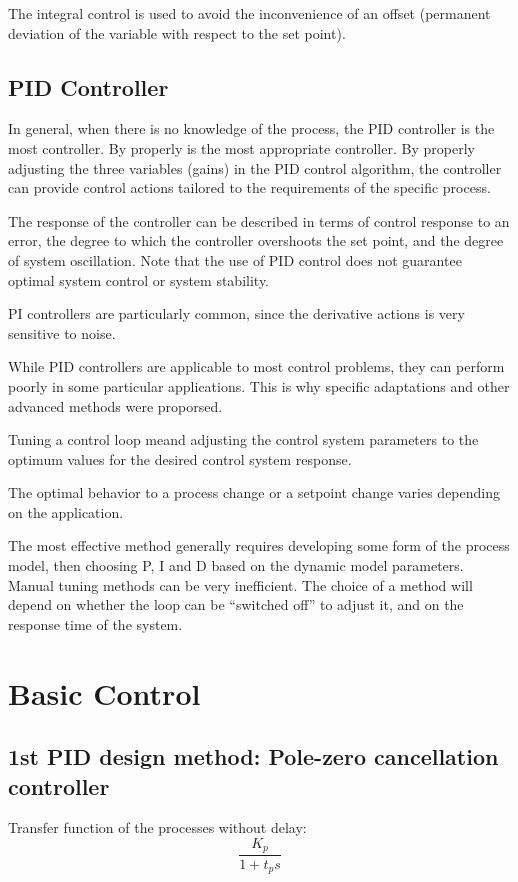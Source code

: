 The integral control is used to avoid the inconvenience of an offset (permanent deviation of the variable with respect to the set point).

\subsection{PID Controller}
In general, when there is no knowledge of the process, the PID controller is the most controller. By properly is the most appropriate controller. By properly adjusting the three variables (gains) in the PID control algorithm, the controller can provide control actions tailored to the requirements of the specific process.

The response of the controller can be described in terms of control response to an error, the degree to which the controller overshoots the set point, and the degree of system oscillation. Note that the use of PID control does not guarantee optimal system control or system stability.

PI controllers are particularly common, since the derivative actions is very sensitive to noise.

While PID controllers are applicable to most control problems, they can perform poorly in some particular applications. This is why specific adaptations and other advanced methods were proporsed.

Tuning a control loop meand adjusting the control system parameters to the optimum values for the desired control system response.

The optimal behavior to a process change or a setpoint change varies depending on the application.

The most effective method generally requires developing some form of the process model, then choosing P, I and D based on the dynamic model parameters. Manual tuning methods can be very inefficient. The choice of a method will depend on whether the loop can be ``switched off'' to adjust it, and on the response time of the system.

\section{Basic Control}
\subsection{1st PID design method: Pole-zero cancellation controller}

Transfer function of the processes without delay: 
\[\frac{K_p}{1 + t_p s}\]

